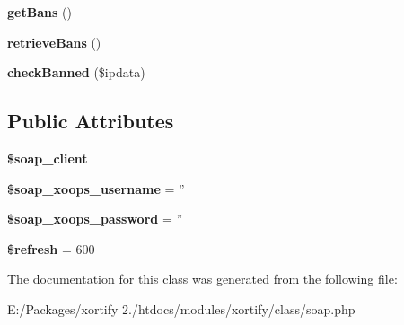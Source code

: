 \begin{DoxyCompactItemize}
\item 
\hypertarget{class_s_o_a_p_xortify_exchange_a198b7faaa8cb1484ebf80b0d890ea82b}{{\bfseries get\-Bans} ()}\label{class_s_o_a_p_xortify_exchange_a198b7faaa8cb1484ebf80b0d890ea82b}

\item 
\hypertarget{class_s_o_a_p_xortify_exchange_acf8bedb7f67feff7e29acc3d8f2a0245}{{\bfseries retrieve\-Bans} ()}\label{class_s_o_a_p_xortify_exchange_acf8bedb7f67feff7e29acc3d8f2a0245}

\item 
\hypertarget{class_s_o_a_p_xortify_exchange_a892ef1ddda332b7d8c587ad279fcb027}{{\bfseries check\-Banned} (\$ipdata)}\label{class_s_o_a_p_xortify_exchange_a892ef1ddda332b7d8c587ad279fcb027}

\end{DoxyCompactItemize}
\subsection*{Public Attributes}
\begin{DoxyCompactItemize}
\item 
\hypertarget{class_s_o_a_p_xortify_exchange_a96161594d6f2b2d4c20ce79d21f07798}{{\bfseries \$soap\-\_\-client}}\label{class_s_o_a_p_xortify_exchange_a96161594d6f2b2d4c20ce79d21f07798}

\item 
\hypertarget{class_s_o_a_p_xortify_exchange_a933932edeecd0282214637ecc8da5d6c}{{\bfseries \$soap\-\_\-xoops\-\_\-username} = ''}\label{class_s_o_a_p_xortify_exchange_a933932edeecd0282214637ecc8da5d6c}

\item 
\hypertarget{class_s_o_a_p_xortify_exchange_aa7afcf8015f38072b6084b6b7cc726f2}{{\bfseries \$soap\-\_\-xoops\-\_\-password} = ''}\label{class_s_o_a_p_xortify_exchange_aa7afcf8015f38072b6084b6b7cc726f2}

\item 
\hypertarget{class_s_o_a_p_xortify_exchange_a67839d550b49d915194d903e88d3fa7c}{{\bfseries \$refresh} = 600}\label{class_s_o_a_p_xortify_exchange_a67839d550b49d915194d903e88d3fa7c}

\end{DoxyCompactItemize}


The documentation for this class was generated from the following file\-:\begin{DoxyCompactItemize}
\item 
E\-:/\-Packages/xortify 2./htdocs/modules/xortify/class/soap.\-php\end{DoxyCompactItemize}
